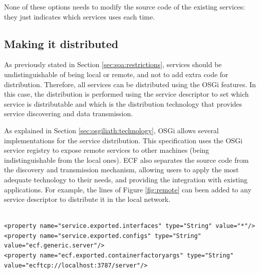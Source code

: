 None of these options needs to modify the source code of the existing
services: they just indicates which services uses each time.

\subsection{Making it distributed}
\label{sec:osgiliath:distributed}

As previously stated in Section \ref{sec:soa:restrictions}, services should be undistinguishable of being local or remote, and not to add extra code for distribution. Therefore, all services
can be distributed using the OSGi features. In this case, the
distribution is performed using the service descriptor to set which
service is distributable and which is the distribution technology that
provides service discovering and data transmission. 

As explained in Section \ref{sec:osgiliath:technology}, %
 OSGi allows several implementations for the service
 distribution. 
 This specification uses the OSGi service registry to expose remote services to other machines (being indistinguishable from the local ones).  ECF also separates the source code from the discovery and transmission mechanism, allowing users to apply the most adequate technology to their needs, and providing the integration with existing applications. For example, the lines of Figure \ref{fig:remote} can been added to any service descriptor to distribute it in the local network.

 





\newsavebox{\mintedboxServer}
\begin{lrbox}{\mintedboxServer}
\begin{minipage}{10cm}
\begin{verbatim}

<property name="service.exported.interfaces" type="String" value="*"/>
<property name="service.exported.configs" type="String" 
value="ecf.generic.server"/>
<property name="ecf.exported.containerfactoryargs" type="String" 
value="ecftcp://localhost:3787/server"/>
\end{verbatim}
\end{minipage}
\end{lrbox}

